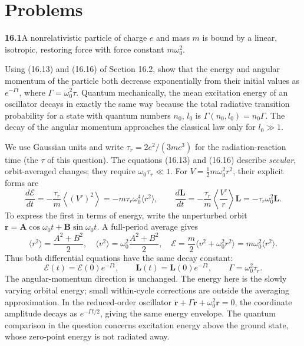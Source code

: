 
\section*{Problems}

\par\bigskip
\noindent\textbf{16.1}\quad A nonrelativistic particle of charge $e$ and mass $m$ is bound by a linear, isotropic, restoring force with force constant $m\omega_{0}^{2}$.

Using (16.13) and (16.16) of Section 16.2, show that the energy and angular momentum of the particle both decrease exponentially from their initial values as $e^{-\Gamma t}$, where $\Gamma=\omega_{0}^{2}\tau$. Quantum mechanically, the mean excitation energy of an oscillator decays in exactly the same way because the total radiative transition probability for a state with quantum numbers $n_{0}$, $l_{0}$ is $\Gamma(n_{0},l_{0})=n_{0}\Gamma$. The decay of the angular momentum approaches the classical law only for $l_{0}\gg1$.
\solution

We use Gaussian units and write $\tau_r=2e^2/(3mc^3)$ for the
radiation-reaction time (the $\tau$ of this question). The equations
(16.13) and (16.16) describe \emph{secular}, orbit-averaged changes;
they require $\omega_0\tau_r\ll1$.
For $V=\tfrac12m\omega_0^2r^2$, their explicit forms are
\[
\frac{d\mathcal E}{dt}=-\frac{\tau_r}{m}
\left\langle(V')^2\right\rangle
=-m\tau_r\omega_0^4\langle r^2\rangle,
\qquad
\frac{d\mathbf L}{dt}=-\frac{\tau_r}{m}
\left\langle\frac{V'}r\right\rangle\mathbf L
=-\tau_r\omega_0^2\mathbf L.
\]
To express the first in terms of energy, write the unperturbed orbit
$\mathbf r=\mathbf A\cos\omega_0t+\mathbf B\sin\omega_0t$.
A full-period average gives
\[
\langle r^2\rangle=\frac{A^2+B^2}{2},\quad
\langle v^2\rangle=\omega_0^2\frac{A^2+B^2}{2},\quad
\mathcal E=\frac m2\langle v^2+\omega_0^2r^2\rangle
=m\omega_0^2\langle r^2\rangle.
\]
Thus both differential equations have the same decay constant:
\[
\boxed{\mathcal E(t)=\mathcal E(0)e^{-\Gamma t},\qquad
\mathbf L(t)=\mathbf L(0)e^{-\Gamma t},\qquad
\Gamma=\omega_0^2\tau_r.}
\]
The angular-momentum direction is unchanged. The energy here is the
slowly varying orbital energy; small within-cycle corrections are
outside the averaging approximation. In the reduced-order oscillator
$\ddot{\mathbf r}+\Gamma\dot{\mathbf r}+\omega_0^2\mathbf r=0$,
the coordinate amplitude decays as $e^{-\Gamma t/2}$, giving the same
energy envelope. The quantum comparison in the question concerns
excitation energy above the ground state, whose zero-point energy is
not radiated away.

